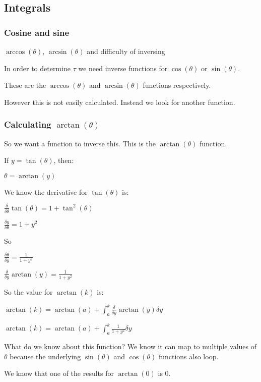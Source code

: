 
\subsection{Integrals}

\subsubsection{Cosine and sine}

\(\arccos (\theta)\), \(\arcsin (\theta )\) and difficulty of inversing

In order to determine \(\tau \) we need inverse functions for \(\cos (\theta )\) or \(\sin (\theta )\).

These are the \(\arccos (\theta )\) and \(\arcsin (\theta )\) functions respectively.

However this is not easily calculated. Instead we look for another function.

\subsubsection{Calculating \(\arctan (\theta )\)}

So we want a function to inverse this. This is the \(\arctan (\theta )\) function.

If \(y=\tan (\theta )\), then:

$\theta =\arctan (y)$

We know the derivative for \(\tan (\theta )\) is:

$\frac{\delta }{\delta \theta }\tan (\theta )=1+\tan^2(\theta )$

$\frac{\delta y}{\delta \theta }=1+y^2$

So

$\frac{\delta \theta }{\delta y}=\frac{1}{1+y^2}$

$\frac{\delta }{\delta y}\arctan (y)=\frac{1}{1+y^2}$

So the value for \(\arctan (k)\) is:

$\arctan (k)=\arctan (a)+\int_a^k\frac{\delta }{\delta y}\arctan (y) \delta y$

$\arctan (k)=\arctan (a)+\int_a^k\frac{1}{1+y^2} \delta y$

What do we know about this function? We know it can map to multiple values of \(\theta \) because the underlying \(\sin (\theta )\) and \(\cos (\theta )\) functions also loop.

We know that one of the results for \(\arctan (0)\) is \(0\).

